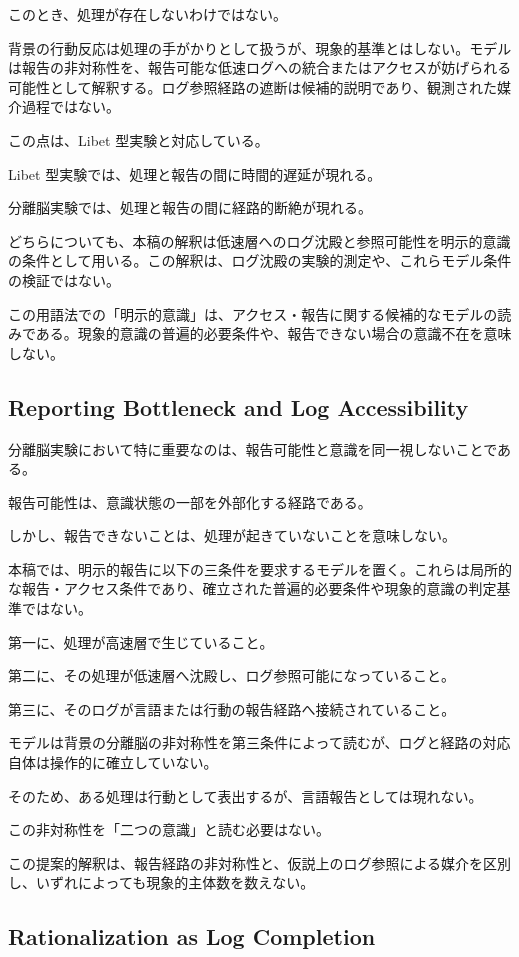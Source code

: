 このとき、処理が存在しないわけではない。

背景の行動反応は処理の手がかりとして扱うが、現象的基準とはしない。モデルは報告の非対称性を、報告可能な低速ログへの統合またはアクセスが妨げられる可能性として解釈する。ログ参照経路の遮断は候補的説明であり、観測された媒介過程ではない。

この点は、Libet 型実験と対応している。

Libet 型実験では、処理と報告の間に時間的遅延が現れる。

分離脳実験では、処理と報告の間に経路的断絶が現れる。

どちらについても、本稿の解釈は低速層へのログ沈殿と参照可能性を明示的意識の条件として用いる。この解釈は、ログ沈殿の実験的測定や、これらモデル条件の検証ではない。

この用語法での「明示的意識」は、アクセス・報告に関する候補的なモデルの読みである。現象的意識の普遍的必要条件や、報告できない場合の意識不在を意味しない。

\subsection{Reporting Bottleneck and Log Accessibility}

分離脳実験において特に重要なのは、報告可能性と意識を同一視しないことである。

報告可能性は、意識状態の一部を外部化する経路である。

しかし、報告できないことは、処理が起きていないことを意味しない。

本稿では、明示的報告に以下の三条件を要求するモデルを置く。これらは局所的な報告・アクセス条件であり、確立された普遍的必要条件や現象的意識の判定基準ではない。

第一に、処理が高速層で生じていること。

第二に、その処理が低速層へ沈殿し、ログ参照可能になっていること。

第三に、そのログが言語または行動の報告経路へ接続されていること。

モデルは背景の分離脳の非対称性を第三条件によって読むが、ログと経路の対応自体は操作的に確立していない。

そのため、ある処理は行動として表出するが、言語報告としては現れない。

この非対称性を「二つの意識」と読む必要はない。

この提案的解釈は、報告経路の非対称性と、仮説上のログ参照による媒介を区別し、いずれによっても現象的主体数を数えない。

\subsection{Rationalization as Log Completion}

